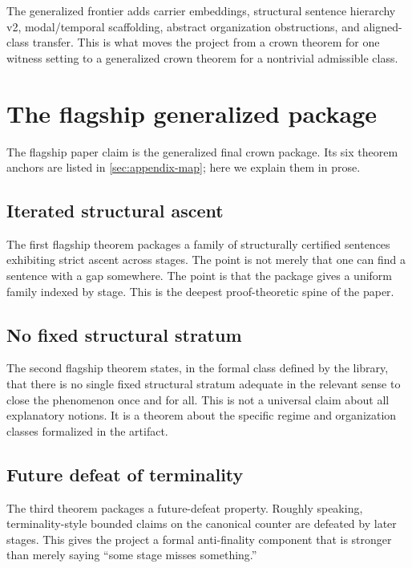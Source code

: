 \documentclass[11pt,a4paper]{article}
\theoremstyle{definition}
\begin{document}
The generalized frontier adds carrier embeddings, structural sentence hierarchy v2, modal/temporal scaffolding, abstract organization obstructions, and aligned-class transfer. This is what moves the project from a crown theorem for one witness setting to a generalized crown theorem for a nontrivial admissible class.

\section{The flagship generalized package}\label{sec:flagship}

The flagship paper claim is the generalized final crown package. Its six theorem anchors are listed in \cref{sec:appendix-map}; here we explain them in prose.

\subsection{Iterated structural ascent}

The first flagship theorem packages a family of structurally certified sentences exhibiting strict ascent across stages. The point is not merely that one can find a sentence with a gap somewhere. The point is that the package gives a uniform family indexed by stage. This is the deepest proof-theoretic spine of the paper.

\subsection{No fixed structural stratum}

The second flagship theorem states, in the formal class defined by the library, that there is no single fixed structural stratum adequate in the relevant sense to close the phenomenon once and for all. This is not a universal claim about all explanatory notions. It is a theorem about the specific regime and organization classes formalized in the artifact.

\subsection{Future defeat of terminality}

The third theorem packages a future-defeat property. Roughly speaking, terminality-style bounded claims on the canonical counter are defeated by later stages. This gives the project a formal anti-finality component that is stronger than merely saying ``some stage misses something.''
\end{document}
